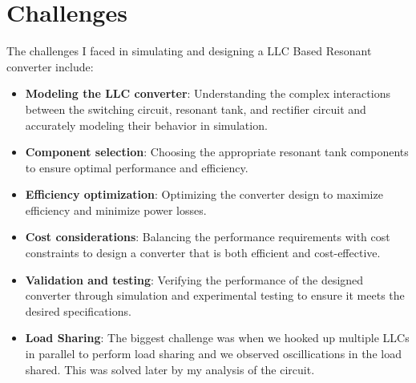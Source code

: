 \section{Challenges}
The challenges I faced in simulating and designing a LLC Based Resonant converter include:
\begin{itemize}
    \item \textbf{Modeling the LLC converter}: Understanding the complex interactions between the switching circuit, resonant tank, and rectifier circuit and accurately modeling their behavior in simulation.
    \item \textbf{Component selection}: Choosing the appropriate resonant tank components to ensure optimal performance and efficiency.
    \item \textbf{Efficiency optimization}: Optimizing the converter design to maximize efficiency and minimize power losses.
    \item \textbf{Cost considerations}: Balancing the performance requirements with cost constraints to design a converter that is both efficient and cost-effective.
    \item \textbf{Validation and testing}: Verifying the performance of the designed converter through simulation and experimental testing to ensure it meets the desired specifications.
    \item \textbf{Load Sharing}: The biggest challenge was when we hooked up multiple LLCs in parallel to perform load sharing and we observed oscillications in the load shared. This was solved later by my analysis of the circuit.
\end{itemize}